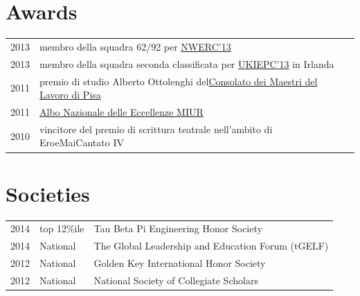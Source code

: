 \documentclass[a4paper]{deedy-resume} %
\begin{document}
\begin{minipage}[t]{0.66\textwidth}

\section{Awards} 

\begin{tabular}{rll}
2013	 & membro della squadra 62/92 per \href{http://www.nwerc.eu/}{NWERC'13}\\
2013	 & membro della squadra seconda classificata per \href{http://www.cs.nott.ac.uk/~mlw/ukiepc/}{UKIEPC'13} in Irlanda\\
2011	 & premio di studio Alberto Ottolenghi del\href{http://www.maestrilavoro.it/index/elenco_consolati/it-toscana-pisa.html}{Consolato dei Maestri del Lavoro di Pisa}\\
2011	 & \href{http://www.indire.it/eccellenze/}{Albo Nazionale delle Eccellenze MIUR}\\
2010	 & vincitore del premio di scrittura teatrale nell'ambito di EroeMaiCantato IV\\
\end{tabular}

\sectionspace %


\section{Societies} 

\begin{tabular}{rll}
2014 & top 12\%ile & Tau Beta Pi Engineering Honor Society\\
2014 & National & The Global Leadership and Education Forum (tGELF)\\
2012 & National & Golden Key International Honor Society\\
2012 & National & National Society of Collegiate Scholars\\
\end{tabular}

\sectionspace %


\end{minipage} %
\end{document}
